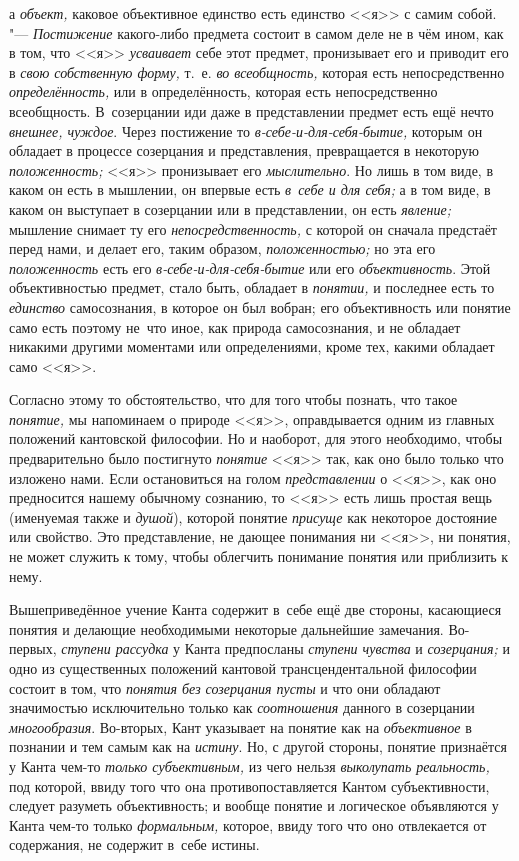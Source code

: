 а {\em объект,} каковое объективное единство есть единство <<я>> с самим собой. "---
{\em Постижение} какого-либо предмета состоит в самом деле не в чём ином, как
в том, что <<я>> {\em усваивает} себе этот предмет, пронизывает его и приводит его
в {\em свою собственную форму,} т.~е. {\em во всеобщность,} которая есть
непосредственно {\em определённость,} или в определённость, которая есть
непосредственно всеобщность. В~созерцании иди даже в представлении предмет
есть ещё нечто {\em внешнее, чуждое}. Через постижение то
{\em в-себе-и-для-себя-бытие,} которым он обладает в процессе созерцания и
представления, превращается в некоторую {\em положенность;} <<я>> пронизывает
его {\em мыслительно}. Но лишь в том виде, в каком он есть в мышлении, он
впервые есть {\em в~себе и для себя;} а в том виде, в каком он выступает в
созерцании или в представлении, он есть {\em явление;} мышление снимает ту
его {\em непосредственность,} с которой он сначала предстаёт перед нами, и
делает его, таким образом, {\em положенностью;} но эта его {\em положенность}
есть его {\em в-себе-и-для-себя-бытие} или его {\em объективность}. Этой
объективностью предмет, стало быть, обладает в {\em понятии,} и последнее
есть то {\em единство} самосознания, в которое он был вобран; его
объективность или понятие само есть поэтому не~что иное, как природа
самосознания, и не обладает никакими другими моментами или определениями,
кроме тех, какими обладает само <<я>>.

Согласно этому то обстоятельство, что для того чтобы познать, что такое
{\em понятие,} мы напоминаем о природе <<я>>, оправдывается одним из главных
положений кантовской философии. Но и наоборот, для этого необходимо, чтобы
предварительно было постигнуто {\em понятие} <<я>> так, как оно было только что
изложено нами. Если остановиться на голом {\em представлении} о <<я>>, как оно
предносится нашему обычному сознанию, то <<я>> есть лишь простая вещь
(именуемая также и {\em душой}), которой понятие {\em присуще} как некоторое
достояние или свойство. Это представление, не дающее понимания ни <<я>>, ни
понятия, не может служить к тому, чтобы облегчить понимание понятия или
приблизить к нему.

Вышеприведённое учение Канта содержит в~себе ещё две стороны,
касающиеся понятия и делающие необходимыми некоторые дальнейшие замечания.
Во-первых, {\em ступени рассудка} у Канта предпосланы {\em ступени чувства} и
{\em созерцания;} и одно из существенных положений кантовой трансцендентальной
философии состоит в том, что {\em понятия без созерцания
пусты} и что они обладают значимостью исключительно только
как {\em соотношения} данного в созерцании {\em многообразия}.
Во-вторых, Кант указывает на понятие как на {\em объективное}
в познании и тем самым как на {\em истину}. Но, с
другой стороны, понятие признаётся у Канта чем-то {\em только субъективным,}
из чего нельзя {\em выколупать реальность,}
под которой, ввиду того что она противопоставляется Кантом
субъективности, следует разуметь объективность; и вообще понятие и
логическое объявляются у Канта чем-то только {\em формальным,} которое,
ввиду того что оно отвлекается от содержания, не содержит в~себе истины.

